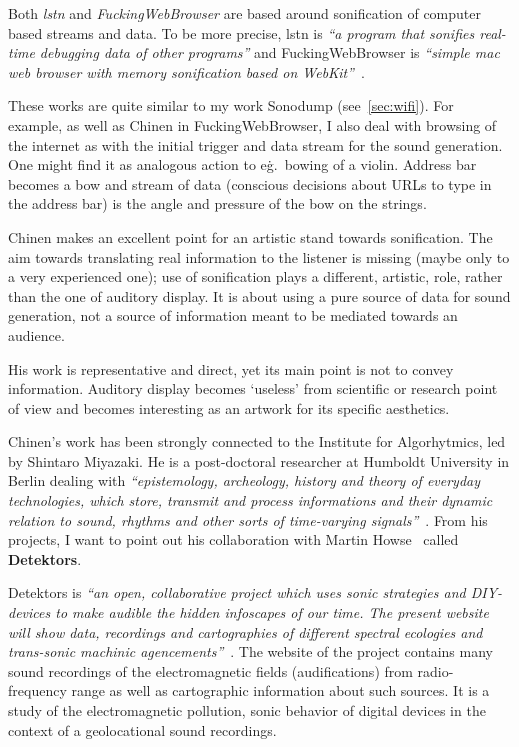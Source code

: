 \documentclass[12pt,a4paper,oneside]{report}
\begin{document}
Both \emph{lstn} and \emph{FuckingWebBrowser} are based around sonification of computer based streams and data. To be more precise, lstn is \emph{``a program that sonifies real-time debugging data of other programs''} and FuckingWebBrowser is \emph{``simple mac web browser with memory sonification based on WebKit''}~\cite{Chinen2010, Chinen2010a}.

These works are quite similar to my work Sonodump (see~\ref{sec:wifi}). For example, as well as Chinen in FuckingWebBrowser, I also deal with browsing of the internet as with the initial trigger and data stream for the sound generation. One might find it as analogous action to e\.g.\, bowing of a violin. Address bar becomes a bow and stream of data (conscious decisions about URLs to type in the address bar) is the angle and pressure of the bow on the strings. 

Chinen makes an excellent point for an artistic stand towards sonification. The aim towards translating real information to the listener is missing (maybe only to a very experienced one); use of sonification plays a different, artistic, role, rather than the one of auditory display. It is about using a pure source of data for sound generation, not a source of information meant to be mediated towards an audience.

His work is representative and direct, yet its main point is not to convey information. Auditory display becomes `useless' from scientific or research point of view and becomes interesting as an artwork for its specific aesthetics.

Chinen's work has been strongly connected to the Institute for Algorhytmics, led by Shintaro Miyazaki. He is a post-doctoral researcher at Humboldt University in Berlin dealing with \emph{``epistemology, archeology, history and theory of everyday technologies, which store, transmit and process informations and their dynamic relation to sound, rhythms and other sorts of time-varying signals''}~\cite{Miyazaki2012}. From his projects, I want to point out his collaboration with Martin Howse~\cite{howse} called \textbf{Detektors}.

Detektors is \emph{``an open, collaborative project which uses sonic strategies and DIY-devices to make audible the hidden infoscapes of our time. The present website will show data, recordings and cartographies of different spectral ecologies and trans-sonic machinic agencements''}~\cite{detektors}. The website of the project contains many sound recordings of the electromagnetic fields (audifications) from radio-frequency range as well as cartographic information about such sources. It is a study of the electromagnetic pollution, sonic behavior of digital devices in the context of a geolocational sound recordings.
\end{document}
